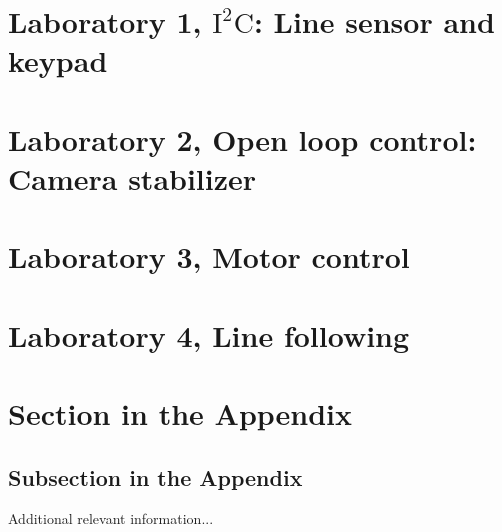 \documentclass[english]{article}
\begin{document}
\tableofcontents
\newpage

\section{Laboratory 1, $\mathrm{I^2C}$: Line sensor and keypad}
\label{sec:lab1}

\clearpage

\section{Laboratory 2, Open loop control: Camera stabilizer}
\label{sec:lab2}

\clearpage

\section{Laboratory 3, Motor control}
\label{sec:lab3}

\clearpage

\section{Laboratory 4, Line following}
\label{sec:lab4}



\clearpage
\appendix

\section{Section in the Appendix}
\label{sec:app1}

\subsection{Subsection in the Appendix}
\label{subsec:app2}

Additional relevant information...
\end{document}
